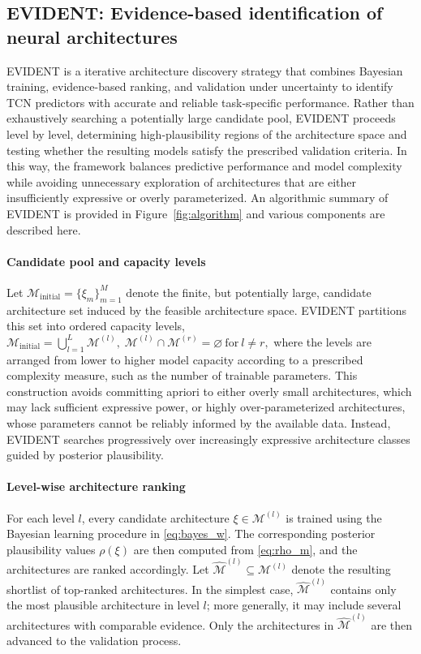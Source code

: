 \documentclass[preprint,12pt]{elsarticle}
\begin{document}
\subsection{EVIDENT: Evidence-based identification
of neural architectures}\label{sec:evident}
EVIDENT is a iterative architecture discovery strategy that combines Bayesian training, evidence-based ranking, and validation under uncertainty to identify TCN predictors with accurate and reliable task-specific performance. Rather than exhaustively searching a potentially large candidate pool, EVIDENT proceeds level by level, determining high-plausibility regions of the architecture space and testing whether the resulting models satisfy the prescribed validation criteria. In this way, the framework balances predictive performance and model complexity while avoiding unnecessary exploration of architectures that are either insufficiently expressive or overly parameterized. An algorithmic summary of EVIDENT is provided in Figure~\ref{fig:algorithm} and various components are described here.

%

\paragraph{Candidate pool and capacity levels}
Let \(\mathcal{M}_{\mathrm{initial}}=\{\xi_m\}_{m=1}^{M}\) denote the finite, but potentially large, candidate architecture set induced by the feasible architecture space. EVIDENT partitions this set into ordered capacity levels,
$
\mathcal{M}_{\mathrm{initial}}
=
\bigcup_{l=1}^{L}\mathcal{M}^{(l)},
\;
\mathcal{M}^{(l)}\cap \mathcal{M}^{(r)}=\varnothing
\ \text{for}\ l\neq r,
$
where the levels are arranged from lower to higher model capacity according to a prescribed complexity measure, such as the number of trainable parameters. This construction avoids committing apriori to either overly small architectures, which may lack sufficient expressive power, or highly over-parameterized architectures, whose parameters cannot be reliably informed by the available data. Instead, EVIDENT searches progressively over increasingly expressive architecture classes guided by posterior plausibility.

%

\paragraph{Level-wise architecture ranking}
For each level \(l\), every candidate architecture \(\xi \in \mathcal{M}^{(l)}\) is trained using the Bayesian learning procedure in \eqref{eq:bayes_w}. The corresponding posterior plausibility values \(\rho(\xi)\) are then computed from \eqref{eq:rho_m}, and the architectures are ranked accordingly. 
Let \(\widehat{\mathcal{M}}^{(l)} \subseteq \mathcal{M}^{(l)}\) denote the resulting shortlist of top-ranked architectures. In the simplest case, \(\widehat{\mathcal{M}}^{(l)}\) contains only the most plausible architecture in level \(l\); more generally, it may include several architectures with comparable evidence. Only the architectures in \(\widehat{\mathcal{M}}^{(l)}\) are then advanced to the validation process.
\end{document}
